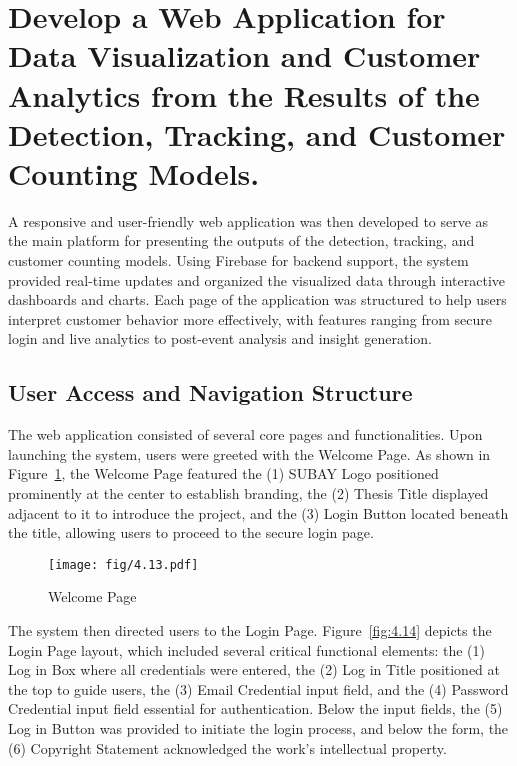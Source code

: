 {\section{Develop a Web Application for Data Visualization and Customer Analytics from the Results of the Detection, Tracking, and Customer Counting Models.}

A responsive and user-friendly web application was then developed to serve as the main platform for presenting the outputs of the detection, tracking, and customer counting models. Using Firebase for backend support, the system provided real-time updates and organized the visualized data through interactive dashboards and charts. Each page of the application was structured to help users interpret customer behavior more effectively, with features ranging from secure login and live analytics to post-event analysis and insight generation.

\subsection{User Access and Navigation Structure}

The web application consisted of several core pages and functionalities. Upon launching the system, users were greeted with the Welcome Page. As shown in Figure~\ref{fig:4.13}, the Welcome Page featured the (1) SUBAY Logo positioned prominently at the center to establish branding, the (2) Thesis Title displayed adjacent to it to introduce the project, and the (3) Login Button located beneath the title, allowing users to proceed to the secure login page.

\begin{figure}[H]
	\caption[Welcome Page]{\newline \newline Welcome Page}
	\centering
	\texttt{[image: fig/4.13.pdf]}
	\label{fig:4.13}
\end{figure}

The system then directed users to the Login Page. Figure~\ref{fig:4.14} depicts the Login Page layout, which included several critical functional elements: the (1) Log in Box where all credentials were entered, the (2) Log in Title positioned at the top to guide users, the (3) Email Credential input field, and the (4) Password Credential input field essential for authentication. Below the input fields, the (5) Log in Button was provided to initiate the login process, and below the form, the (6) Copyright Statement acknowledged the work's intellectual property.

}
